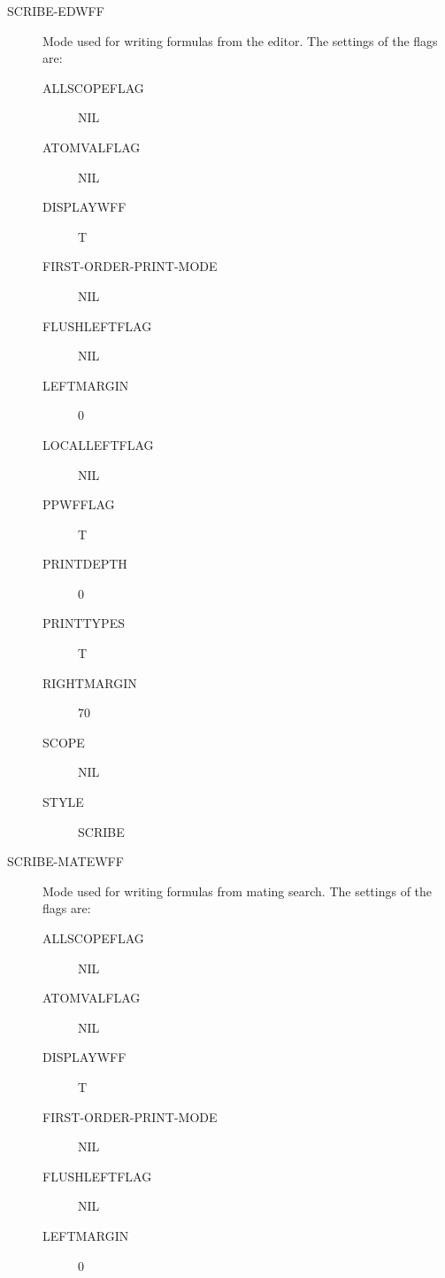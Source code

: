 \begin{description} 
\item[SCRIBE-EDWFF]  
Mode used for writing formulas from the editor. The settings of the flags are:
\begin{description}
\item[ALLSCOPEFLAG] NIL

\item[ATOMVALFLAG] NIL

\item[DISPLAYWFF] T

\item[FIRST-ORDER-PRINT-MODE] NIL

\item[FLUSHLEFTFLAG] NIL

\item[LEFTMARGIN] 0

\item[LOCALLEFTFLAG] NIL

\item[PPWFFLAG] T

\item[PRINTDEPTH] 0

\item[PRINTTYPES] T

\item[RIGHTMARGIN] 70

\item[SCOPE] NIL

\item[STYLE] SCRIBE

\end{description}

\item[SCRIBE-MATEWFF]  
Mode used for writing formulas from mating search. The settings of the flags are:
\begin{description}
\item[ALLSCOPEFLAG] NIL

\item[ATOMVALFLAG] NIL

\item[DISPLAYWFF] T

\item[FIRST-ORDER-PRINT-MODE] NIL

\item[FLUSHLEFTFLAG] NIL

\item[LEFTMARGIN] 0


\end{description}
\end{description}
